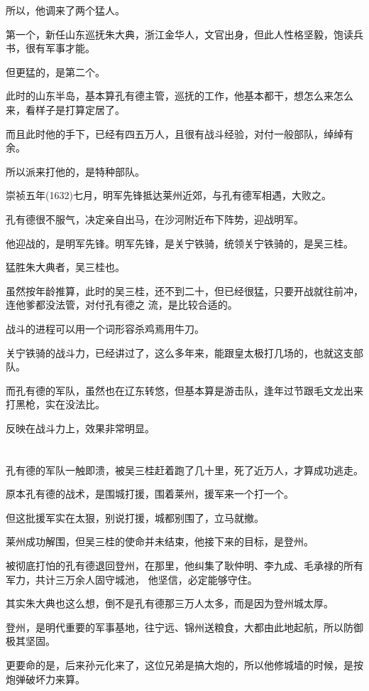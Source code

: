 \documentclass[11pt,a4paper,onecolumn]{article}
\begin{document}
所以，他调来了两个猛人。

第一个，新任山东巡抚朱大典，浙江金华人，文官出身，但此人性格坚毅，饱读兵书，很有军事才能。

但更猛的，是第二个。

此时的山东半岛，基本算孔有德主管，巡抚的工作，他基本都干，想怎么来怎么来，看样子是打算定居了。

而且此时他的手下，已经有四五万人，且很有战斗经验，对付一般部队，绰绰有余。

所以派来打他的，是特种部队。

崇祯五年(1632)七月，明军先锋抵达莱州近郊，与孔有德军相遇，大败之。

孔有德很不服气，决定亲自出马，在沙河附近布下阵势，迎战明军。

他迎战的，是明军先锋。明军先锋，是关宁铁骑，统领关宁铁骑的，是吴三桂。

猛胜朱大典者，吴三桂也。

虽然按年龄推算，此时的吴三桂，还不到二十，但已经很猛，只要开战就往前冲，连他爹都没法管，对付孔有德之
流，是比较合适的。

战斗的进程可以用一个词形容\myrule 杀鸡焉用牛刀。

关宁铁骑的战斗力，已经讲过了，这么多年来，能跟皇太极打几场的，也就这支部队。

而孔有德的军队，虽然也在辽东转悠，但基本算是游击队，逢年过节跟毛文龙出来打黑枪，实在没法比。

反映在战斗力上，效果非常明显。

\section[\thesection]{}

孔有德的军队一触即溃，被吴三桂赶着跑了几十里，死了近万人，才算成功逃走。

原本孔有德的战术，是围城打援，围着莱州，援军来一个打一个。

但这批援军实在太狠，别说打援，城都别围了，立马就撤。

莱州成功解围，但吴三桂的使命并未结束，他接下来的目标，是登州。

被彻底打怕的孔有德退回登州，在那里，他纠集了耿仲明、李九成、毛承禄的所有军力，共计三万余人固守城池，
他坚信，必定能够守住。

其实朱大典也这么想，倒不是孔有德那三万人太多，而是因为登州城太厚。

登州，是明代重要的军事基地，往宁远、锦州送粮食，大都由此地起航，所以防御极其坚固。

更要命的是，后来孙元化来了，这位兄弟是搞大炮的，所以他修城墙的时候，是按炮弹破坏力来算。
\end{document}
